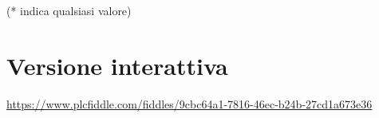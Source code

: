 \documentclass{article}
\begin{document}
    \begin{table}[H]
    \centering
    \end{table}

    (* indica qualsiasi valore)

    \section{Versione interattiva}
    \href{https://www.plcfiddle.com/fiddles/9cbc64a1-7816-46ec-b24b-27cd1a673e36}{https://www.plcfiddle.com/fiddles/9cbc64a1-7816-46ec-b24b-27cd1a673e36}
\end{document}
